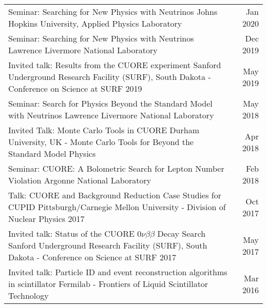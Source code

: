 \documentclass[11pt]{article} %
\begin{document}
\noindent\begin{tabularx}{\linewidth}{@{{}\textbullet\enskip}X@{\quad}r@{}}
Seminar: Searching for New Physics with Neutrinos \newline Johns Hopkins University, Applied Physics Laboratory & Jan 2020\\

\addlinespace[5pt]
Seminar: Searching for New Physics with Neutrinos \newline Lawrence Livermore National Laboratory & Dec 2019\\

\addlinespace[5pt]
Invited talk: Results from the CUORE experiment \newline Sanford Underground Research Facility (SURF), South Dakota - Conference on Science at SURF 2019 & May 2019\\

\addlinespace[5pt]
Seminar: Search for Physics Beyond the Standard Model with Neutrinos \newline Lawrence Livermore National Laboratory & May 2018\\

\addlinespace[5pt]
Invited Talk: Monte Carlo Tools in CUORE \newline Durham University, UK - Monte Carlo Tools for Beyond the Standard Model Physics & Apr 2018 \\

\addlinespace[5pt]
Seminar: CUORE: A Bolometric Search for Lepton Number Violation \newline Argonne National Laboratory & Feb 2018 \\

\addlinespace[5pt]
Talk: CUORE and Background Reduction Case Studies for CUPID \newline Pittsburgh/Carnegie Mellon University - Division of Nuclear Physics 2017 & Oct 2017 \\

\addlinespace[5pt]
Invited talk: Status of the CUORE $0\nu\beta\beta$ Decay Search \newline Sanford Underground Research Facility (SURF), South Dakota - Conference on Science at SURF 2017 & May 2017 \\

\addlinespace[5pt]
Invited talk: Particle ID and event reconstruction algorithms in scintillator \newline Fermilab - Frontiers of Liquid Scintillator Technology & Mar 2016 \\


\end{tabularx}
\end{document}
